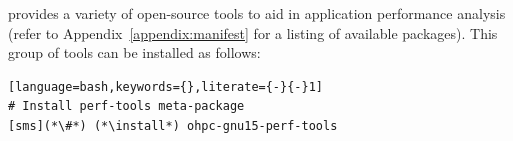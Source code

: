 \OHPC{} provides a variety of open-source tools to aid in application 
performance analysis (refer to Appendix~\ref{appendix:manifest} for a listing
of available packages). This group of tools can be installed as follows:

\begin{lstlisting}[language=bash,keywords={},literate={-}{-}1]
# Install perf-tools meta-package
[sms](*\#*) (*\install*) ohpc-gnu15-perf-tools
\end{lstlisting}
